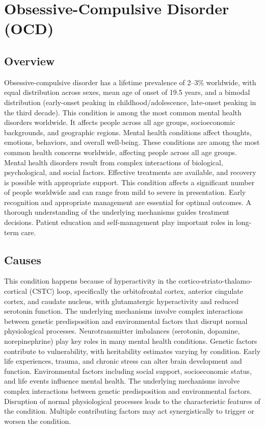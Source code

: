 \chapter{Obsessive-Compulsive Disorder (OCD)}
\label{sec:Obsessive-Compulsive Disorder (OCD)}

\section{Overview}
Obsessive-compulsive disorder has a lifetime prevalence of 2--3\% worldwide, with equal distribution across sexes, mean age of onset of 19.5 years, and a bimodal distribution (early-onset peaking in childhood/adolescence, late-onset peaking in the third decade). This condition is among the most common mental health disorders worldwide. It affects people across all age groups, socioeconomic backgrounds, and geographic regions. Mental health conditions affect thoughts, emotions, behaviors, and overall well-being. These conditions are among the most common health concerns worldwide, affecting people across all age groups. Mental health disorders result from complex interactions of biological, psychological, and social factors. Effective treatments are available, and recovery is possible with appropriate support. This condition affects a significant number of people worldwide and can range from mild to severe in presentation. Early recognition and appropriate management are essential for optimal outcomes. A thorough understanding of the underlying mechanisms guides treatment decisions. Patient education and self-management play important roles in long-term care.
\section{Causes}
This condition happens because of hyperactivity in the cortico-striato-thalamo-cortical (CSTC) loop, specifically the orbitofrontal cortex, anterior cingulate cortex, and caudate nucleus, with glutamatergic hyperactivity and reduced serotonin function. The underlying mechanisms involve complex interactions between genetic predisposition and environmental factors that disrupt normal physiological processes. Neurotransmitter imbalances (serotonin, dopamine, norepinephrine) play key roles in many mental health conditions. Genetic factors contribute to vulnerability, with heritability estimates varying by condition. Early life experiences, trauma, and chronic stress can alter brain development and function. Environmental factors including social support, socioeconomic status, and life events influence mental health. The underlying mechanisms involve complex interactions between genetic predisposition and environmental factors. Disruption of normal physiological processes leads to the characteristic features of the condition. Multiple contributing factors may act synergistically to trigger or worsen the condition.
